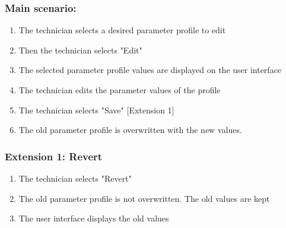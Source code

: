 \begin{framed}
\subsubsection*{Main scenario:}
\begin{enumerate}
	\item The technician selects a desired parameter profile to edit
	\item Then the technician selects "Edit"
	\item The selected parameter profile values are displayed on the user interface
	\item The technician edits the parameter values of the profile
	\item The technician selects "Save" [Extension 1]
	\item The old parameter profile is overwritten with the new values.
\end{enumerate}	

\subsubsection*{Extension 1: Revert}
	\begin{enumerate}
		\item The technician selects "Revert"
		\item The old parameter profile is not overwritten. The old values are kept
		\item The user interface displays the old values
	\end{enumerate}
\end{framed}

